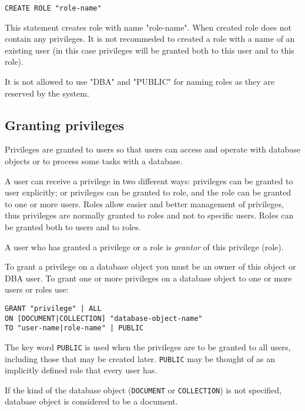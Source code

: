 \documentclass[a4paper,12pt]{article}
\begin{document}
\begin{verbatim}
CREATE ROLE "role-name"
\end{verbatim}

This statement creates role with name "role-name". When created role does not contain any privileges. It is not recommeded to created a role with a name of an existing user (in this case privileges will be granted both to this user and to this role).

It is not allowed to use "DBA" and "PUBLIC" for naming roles as they are reserved by the system.

\subsection{Granting privileges}

Privileges are granted to users so that users can access and operate with database objects or to process some tasks with a database.

A user can receive a privilege in two different ways: privileges can be granted to user explicitly; or privileges can be granted to role, and the role can be granted to one or more users. Roles allow easier and better management of privileges, thus privileges are normally granted to roles and not to specific users. Roles can be granted both to users and to roles.

A user who has granted a privilege or a role is \emph{grantor} of this privilege (role).

To grant a privilege on a database object you must be an owner of this object or DBA user. To grant one or more privileges on a database object to one or more users or roles use:


\begin{verbatim}
GRANT "privilege" | ALL
ON [DOCUMENT|COLLECTION] "database-object-name"
TO "user-name|role-name" | PUBLIC
\end{verbatim}

The key word \verb!PUBLIC! is used when the privileges are to be granted to all users, including those that may be created later. \verb!PUBLIC! may be thought of as an implicitly defined role that every user has.

If the kind of the database object (\verb!DOCUMENT! or \verb!COLLECTION!) is not specified, database object is considered to be a document.
\end{document}
